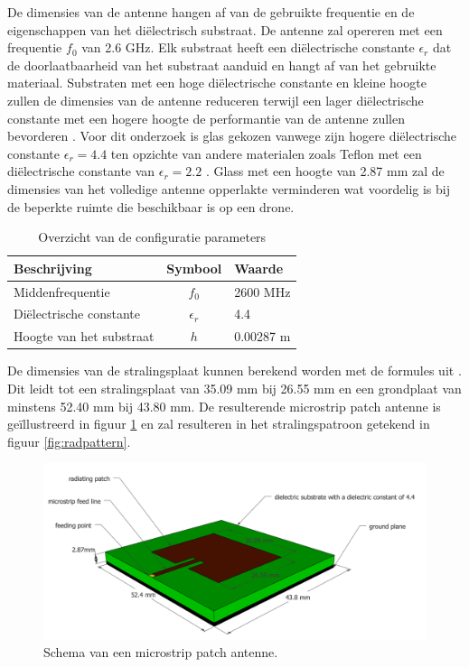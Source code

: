 \documentclass[twocolumn]{phdsymp_dutch}
\begin{document}
De dimensies van de antenne hangen af van de gebruikte frequentie en de eigenschappen van het di\"electrisch substraat.
De antenne zal opereren met een frequentie $f_0$ van 2.6 GHz. 
Elk substraat heeft een di\"electrische constante $\epsilon_r$ dat de doorlaatbaarheid 
van het substraat aanduid en hangt af van het gebruikte materiaal.
Substraten met een hoge di\"electrische constante en kleine hoogte zullen de dimensies van de antenne reduceren 
terwijl  een lager di\"electrische constante met een hogere hoogte de performantie van de 
antenne zullen bevorderen \cite{J14_antennadesign,J15_antennadesign}. 
Voor dit onderzoek is glas gekozen vanwege zijn hogere di\"electrische constante
 $\epsilon_r = 4.4$ ten opzichte van andere materialen zoals Teflon met een di\"electrische constante
van $\epsilon_r = 2.2$ \cite{J14_antennadesign}. 
Glass met een hoogte van 2.87 mm 
zal de dimensies van het volledige antenne opperlakte verminderen wat 
voordelig is bij de beperkte ruimte die beschikbaar is op een drone.

\begin{table}[h!]
\centering
\begin{tabular}{|l|c|l|}
\hline
 Beschrijving            & Symbool          & Waarde         \\    \hline
 Middenfrequentie      & $f_0$           & 2600 MHz       \\ 
 Di\"electrische constante    & $\epsilon_r$    & 4.4         \\ 
 Hoogte van het substraat & $h$             & 0.00287 m    \\ \hline
\end{tabular}
\caption{Overzicht van de configuratie parameters}
\label{table:antennaparas}
\end{table}

De dimensies van de stralingsplaat kunnen berekend worden met de formules uit \cite{J14_antennadesign,J15_antennadesign}.
Dit leidt tot een stralingsplaat van 35.09 mm bij 26.55 mm en  een grondplaat van minstens 52.40 mm bij 43.80 mm.
De resulterende microstrip patch antenne is ge\"illustreerd in figuur \ref{fig:basicpatchantenna} en zal resulteren 
in het stralingspatroon getekend in figuur \ref{fig:radpattern}.
\begin{figure}[h!]
\centering
  \includegraphics[width=\linewidth]{MicrostripAntenna.png}
  \caption{Schema van een microstrip patch antenne.}
  \label{fig:basicpatchantenna}
\end{figure}
\end{document}
